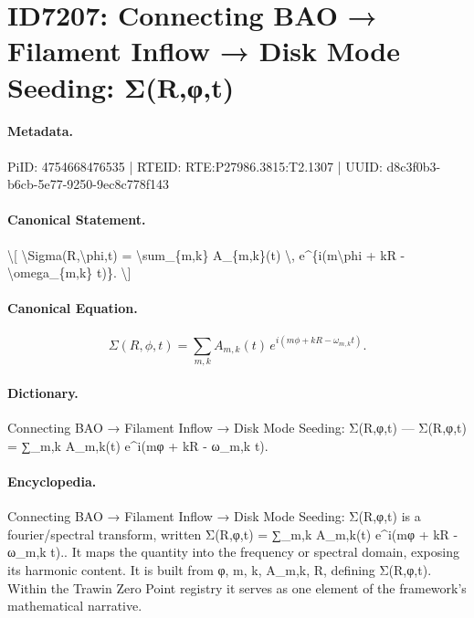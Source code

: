 \section*{ID7207: Connecting BAO → Filament Inflow → Disk Mode Seeding: Σ(R,φ,t)}
\paragraph{Metadata.}
PiID: 4754668476535 | RTEID: RTE:P27986.3815:T2.1307 | UUID: d8c3f0b3-b6cb-5e77-9250-9ec8c778f143

\paragraph{Canonical Statement.}
\textbackslash{}[ \textbackslash{}Sigma(R,\textbackslash{}phi,t) = \textbackslash{}sum\_\{m,k\} A\_\{m,k\}(t) \textbackslash{}, e\textasciicircum{}\{i(m\textbackslash{}phi + kR - \textbackslash{}omega\_\{m,k\} t)\}. \textbackslash{}]

\paragraph{Canonical Equation.}
\[
\Sigma(R,\phi,t) = \sum_{m,k} A_{m,k}(t) \, e^{i(m\phi + kR - \omega_{m,k} t)}.
\]

\paragraph{Dictionary.}
Connecting BAO → Filament Inflow → Disk Mode Seeding: Σ(R,φ,t) — Σ(R,φ,t) = ∑\_m,k A\_m,k(t) e\textasciicircum{}i(mφ + kR - ω\_m,k t).

\paragraph{Encyclopedia.}
Connecting BAO → Filament Inflow → Disk Mode Seeding: Σ(R,φ,t) is a fourier/spectral transform, written Σ(R,φ,t) = ∑\_m,k A\_m,k(t) e\textasciicircum{}i(mφ + kR - ω\_m,k t).. It maps the quantity into the frequency or spectral domain, exposing its harmonic content. It is built from φ, m, k, A\_m,k, R, defining Σ(R,φ,t). Within the Trawin Zero Point registry it serves as one element of the framework's mathematical narrative.
